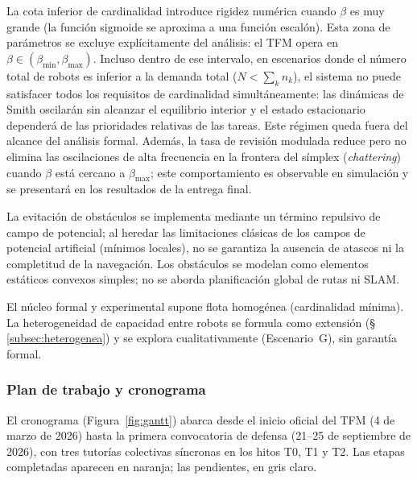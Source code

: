 La cota inferior de cardinalidad introduce rigidez numérica cuando $\beta$ es
muy grande (la función sigmoide se aproxima a una función escalón). Esta zona
de parámetros se excluye explícitamente del análisis: el TFM opera en
$\beta \in (\beta_{\min}, \beta_{\max})$. Incluso dentro de ese intervalo, en
escenarios donde el número total de robots es inferior a la demanda total
($N < \sum_k n_k$), el sistema no puede satisfacer todos los requisitos de
cardinalidad simultáneamente: las dinámicas de Smith oscilarán sin alcanzar
el equilibrio interior y el estado estacionario dependerá de las prioridades
relativas de las tareas. Este régimen queda fuera del alcance del análisis
formal. Además, la tasa de revisión modulada reduce pero no elimina las
oscilaciones de alta frecuencia en la frontera del símplex (\emph{chattering})
cuando $\beta$ está cercano a $\beta_{\max}$; este comportamiento es observable
en simulación y se presentará en los resultados de la entrega final.

La evitación de obstáculos se implementa mediante un término repulsivo de campo de
potencial; al heredar las limitaciones clásicas de los campos de potencial artificial
(mínimos locales), no se garantiza la ausencia de atascos ni la completitud de la
navegación. Los obstáculos se modelan como elementos estáticos convexos simples; no se
aborda planificación global de rutas ni SLAM.

El núcleo formal y experimental supone flota homogénea (cardinalidad mínima). La
heterogeneidad de capacidad entre robots se formula como extensión
(\S\,\ref{subsec:heterogenea}) y se explora cualitativamente (Escenario~G), sin
garantía formal.

\subsubsection{Plan de trabajo y cronograma}
\label{sec:cronograma}

El cronograma (Figura~\ref{fig:gantt}) abarca desde el inicio oficial del TFM
(4 de marzo de 2026) hasta la primera convocatoria de defensa (21--25 de
septiembre de 2026), con tres tutorías colectivas síncronas en los hitos T0,
T1 y T2. Las etapas completadas aparecen en naranja; las pendientes, en gris claro.





